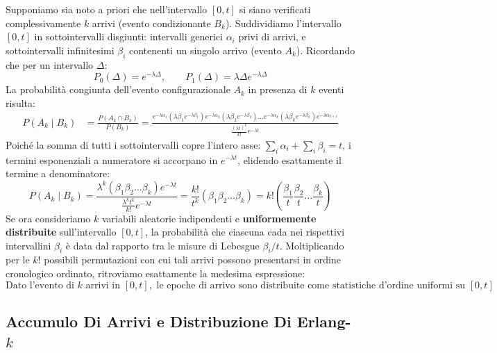 \documentclass[11pt, a4paper]{article}
\begin{document}
Supponiamo sia noto a priori che nell'intervallo $[0, t]$ si siano verificati complessivamente $k$ arrivi (evento condizionante $B_k$). Suddividiamo l'intervallo $[0, t]$ in sottointervalli disgiunti: intervalli generici $\alpha_i$ privi di arrivi, e sottointervalli infinitesimi $\beta_i$ contenenti un singolo arrivo (evento $A_k$). Ricordando che per un intervallo $\Delta$:
\[
    P_0(\Delta) = e^{-\lambda \Delta}, \qquad P_1(\Delta) = \lambda \Delta e^{-\lambda \Delta}
\]
La probabilità congiunta dell'evento configurazionale $A_k$ in presenza di $k$ eventi risulta:
\begin{align*}
    P(A_k \mid B_k) &= \frac{P(A_k \cap B_k)}{P(B_k)} = \frac{e^{-\lambda \alpha_1} (\lambda \beta_1 e^{-\lambda \beta_1}) e^{-\lambda \alpha_2} (\lambda \beta_2 e^{-\lambda \beta_2}) \dots e^{-\lambda \alpha_k} (\lambda \beta_k e^{-\lambda \beta_k}) e^{-\lambda \alpha_{k+1}}}{\frac{(\lambda t)^k}{k!} e^{-\lambda t}}
\end{align*}
Poiché la somma di tutti i sottointervalli copre l'intero asse: $\sum_{i} \alpha_i + \sum_{i} \beta_i = t$, i termini esponenziali a numeratore si accorpano in $e^{-\lambda t}$, elidendo esattamente il termine a denominatore:
\[
    P(A_k \mid B_k) = \frac{\lambda^k (\beta_1 \beta_2 \dots \beta_k) e^{-\lambda t}}{\frac{\lambda^k t^k}{k!} e^{-\lambda t}} = \boxed{\frac{k!}{t^k} (\beta_1 \beta_2 \dots \beta_k) = k! \left( \frac{\beta_1}{t} \frac{\beta_2}{t} \dots \frac{\beta_k}{t} \right)}
\]
Se ora consideriamo $k$ variabili aleatorie indipendenti e \textbf{uniformemente distribuite} sull'intervallo $[0, t]$, la probabilità che ciascuna cada nei rispettivi intervallini $\beta_i$ è data dal rapporto tra le misure di Lebesgue $\beta_i / t$. Moltiplicando per le $k!$ possibili permutazioni con cui tali arrivi possono presentarsi in ordine cronologico ordinato, ritroviamo esattamente la medesima espressione:
\[
    \boxed{\text{Dato l'evento di } k \text{ arrivi in } [0, t], \text{ le epoche di arrivo sono distribuite come statistiche d'ordine uniformi su } [0, t]}
\]

\subsection{Accumulo Di Arrivi e Distribuzione Di Erlang-\texorpdfstring{$k$}{k}}
\end{document}

